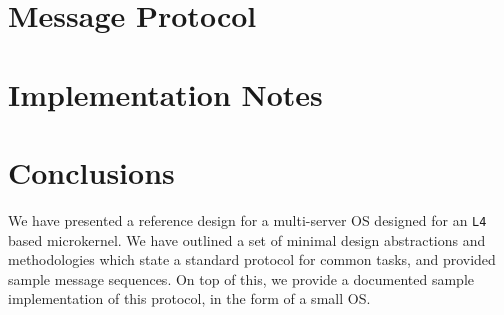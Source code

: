 \documentclass[a4paper,11pt,twoside]{report}
\begin{document}
\chapter{Message Protocol}
\label{s:protocolip}


\chapter{Implementation Notes}
\label{s:implementation}


\chapter{\label{s:concl}Conclusions}

We have presented a reference design for a multi-server OS designed for an \texttt{L4} based
microkernel. We have outlined a set of minimal design abstractions and methodologies which state
a standard protocol for common tasks, and provided sample message sequences.
On top of this, we provide a documented sample implementation of this protocol, in the form of a
small OS.

%
%

\end{document}
